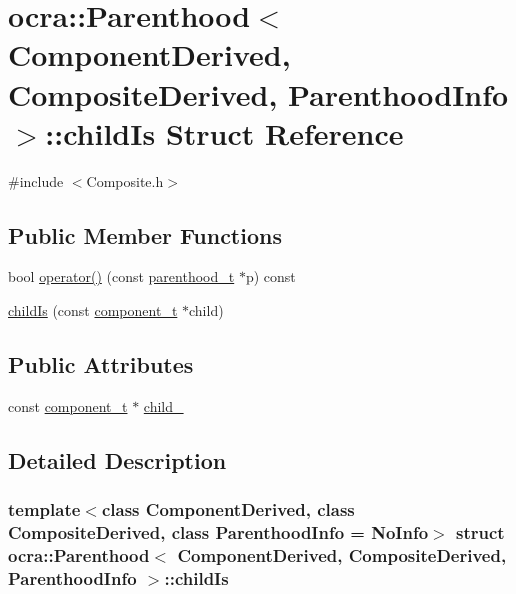 \hypertarget{structocra_1_1Parenthood_1_1childIs}{}\section{ocra\+:\+:Parenthood$<$ Component\+Derived, Composite\+Derived, Parenthood\+Info $>$\+:\+:child\+Is Struct Reference}
\label{structocra_1_1Parenthood_1_1childIs}


{\ttfamily \#include $<$Composite.\+h$>$}

\subsection*{Public Member Functions}
\begin{DoxyCompactItemize}
\item 
bool \hyperlink{structocra_1_1Parenthood_1_1childIs_acc2f7b0a548c4420f5d7349c013417ba}{operator()} (const \hyperlink{classocra_1_1Parenthood_acdae20cb747190b5dc9dbe42290bde78}{parenthood\+\_\+t} $\ast$p) const
\item 
\hyperlink{structocra_1_1Parenthood_1_1childIs_a19d608fdf341bf6e8c98578a5d2e5221}{child\+Is} (const \hyperlink{classocra_1_1Parenthood_a44b601577125fe0fd1d1e5ae4f143349}{component\+\_\+t} $\ast$child)
\end{DoxyCompactItemize}
\subsection*{Public Attributes}
\begin{DoxyCompactItemize}
\item 
const \hyperlink{classocra_1_1Parenthood_a44b601577125fe0fd1d1e5ae4f143349}{component\+\_\+t} $\ast$ \hyperlink{structocra_1_1Parenthood_1_1childIs_a6e3329ea395bbb40d41caceecb1587b7}{child\+\_\+}
\end{DoxyCompactItemize}


\subsection{Detailed Description}
\subsubsection*{template$<$class Component\+Derived, class Composite\+Derived, class Parenthood\+Info = No\+Info$>$\newline
struct ocra\+::\+Parenthood$<$ Component\+Derived, Composite\+Derived, Parenthood\+Info $>$\+::child\+Is}



